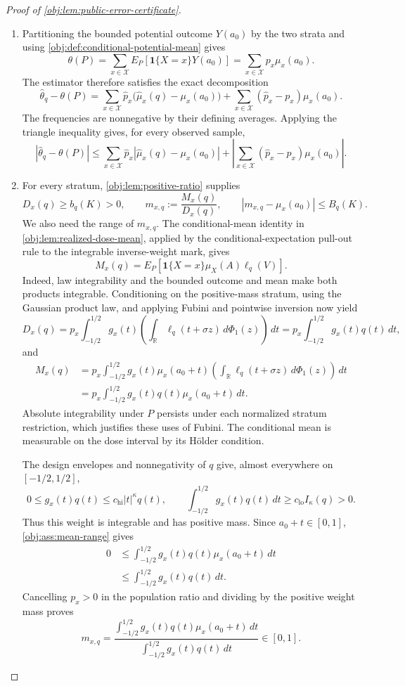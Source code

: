 \begin{proof}[Proof of \cref{obj:lem:public-error-certificate}]
\begin{enumerate}
\item
Partitioning the bounded potential outcome \(Y(a_0)\) by the two strata
and using \cref{obj:def:conditional-potential-mean} gives
\[
\theta(P)
=\sum_{x\in\mathcal X}E_P[\mathbf1\{X=x\}Y(a_0)]
=\sum_{x\in\mathcal X}p_x\mu_x(a_0).
\]
The estimator therefore satisfies the exact decomposition
\[
\widehat\theta_q-\theta(P)
=\sum_{x\in\mathcal X}\widehat p_x
       \bigl(\widehat\mu_x(q)-\mu_x(a_0)\bigr)
 +\sum_{x\in\mathcal X}(\widehat p_x-p_x)\mu_x(a_0).
\]
The frequencies are nonnegative by their defining averages. Applying the
triangle inequality gives, for every observed sample,
\[
|\widehat\theta_q-\theta(P)|
\le
\sum_{x\in\mathcal X}\widehat p_x
       |\widehat\mu_x(q)-\mu_x(a_0)|
+\left|\sum_{x\in\mathcal X}(\widehat p_x-p_x)\mu_x(a_0)\right|.
\]

\item
For every stratum, \cref{obj:lem:positive-ratio} supplies
\[
D_x(q)\ge b_q(K)>0,\qquad
m_{x,q}:=\frac{M_x(q)}{D_x(q)},\qquad
|m_{x,q}-\mu_x(a_0)|\le B_q(K).
\]
We also need the range of \(m_{x,q}\). The conditional-mean identity in
\cref{obj:lem:realized-dose-mean}, applied by the conditional-expectation
pull-out rule to the integrable inverse-weight mark, gives
\[
M_x(q)
=E_P[\mathbf1\{X=x\}\mu_X(A)\ell_q(V)].
\]
Indeed, law integrability and the bounded outcome and mean make both
products integrable. Conditioning on the positive-mass stratum, using
the Gaussian product law, and applying Fubini and pointwise inversion
now yield
\[
D_x(q)
=p_x\int_{-1/2}^{1/2}g_x(t)
       \left(\int_{\mathbb R}\ell_q(t+\sigma z)\,d\Phi_1(z)\right)\,dt
=p_x\int_{-1/2}^{1/2}g_x(t)q(t)\,dt,
\]
and
\[
\begin{aligned}
M_x(q)
&=p_x\int_{-1/2}^{1/2}g_x(t)\mu_x(a_0+t)
       \left(\int_{\mathbb R}\ell_q(t+\sigma z)\,d\Phi_1(z)\right)\,dt\\
&=p_x\int_{-1/2}^{1/2}g_x(t)q(t)\mu_x(a_0+t)\,dt.
\end{aligned}
\]
Absolute integrability under \(P\) persists under each normalized
stratum restriction, which justifies these uses of Fubini. The
conditional mean is measurable on the dose interval by its Hölder
condition.

The design envelopes and nonnegativity of \(q\) give, almost everywhere
on \([-1/2,1/2]\),
\[
0\le g_x(t)q(t)\le c_{\mathrm{hi}}|t|^\kappa q(t),
\qquad
\int_{-1/2}^{1/2}g_x(t)q(t)\,dt
\ge c_{\mathrm{lo}}I_\kappa(q)>0.
\]
Thus this weight is integrable and has positive mass. Since
\(a_0+t\in[0,1]\), \cref{obj:ass:mean-range} gives
\[
\begin{aligned}
0
&\le\int_{-1/2}^{1/2}g_x(t)q(t)\mu_x(a_0+t)\,dt\\
&\le\int_{-1/2}^{1/2}g_x(t)q(t)\,dt.
\end{aligned}
\]
Cancelling \(p_x>0\) in the population ratio and dividing by the positive
weight mass proves
\[
m_{x,q}
=\frac{\displaystyle\int_{-1/2}^{1/2}g_x(t)q(t)\mu_x(a_0+t)\,dt}
       {\displaystyle\int_{-1/2}^{1/2}g_x(t)q(t)\,dt}
\in[0,1].
\]


\end{enumerate}
\end{proof}
